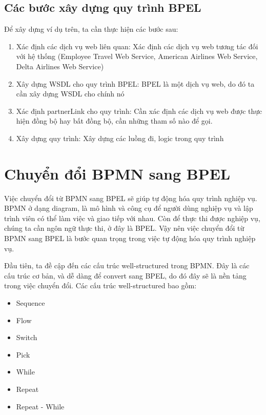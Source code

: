 \subsection{Các bước xây dựng quy trình BPEL}
Để xây dựng ví dụ trên, ta cần thực hiện các bước sau:
\begin{enumerate}
	\item Xác định các dịch vụ web liên quan: Xác định các dịch vụ web tương tác đối với hệ thống (Employee Travel Web Service, American Airlines Web Service, Delta Airlines Web Service)
	\item Xây dựng WSDL cho quy trình BPEL: BPEL là một dịch vụ web, do đó ta cần xây dựng WSDL cho chính nó
	\item Xác định partnerLink cho quy trình: Cần xác định các dịch vụ web được thực hiện đồng bộ hay bất đồng bộ, cần những tham số nào để gọi.
	\item Xây dựng quy trình: Xây dựng các luồng đi, logic trong quy trình
\end{enumerate} 



\section{Chuyển đổi BPMN sang BPEL}
\hspace*{0.5cm} \par Việc chuyển đổi từ BPMN sang BPEL sẽ giúp tự động hóa quy trình nghiệp vụ. BPMN ở dạng diagram, là mô hình và công cụ để người dùng nghiệp vụ và lập trình viên có thể làm việc và giao tiếp với nhau. 
Còn để thực thi được nghiệp vụ, chúng ta cần ngôn ngữ thực thi, ở đây là BPEL. Vậy nên việc chuyển đổi từ BPMN sang BPEL là bước quan trọng trong việc tự động hóa quy trình nghiệp vụ.

\par Đầu tiên, ta đề cập đến các cấu trúc well-structured trong BPMN. Đây là các cấu trúc cơ bản, và dễ dàng để convert sang BPEL, do đó đây sẽ là nền tảng trong việc chuyển đổi. Các cấu trúc well-structured bao gồm:
\begin{itemize}
	\item Sequence
	\item Flow
	\item Switch
	\item Pick
	\item While
	\item Repeat
	\item Repeat - While
\end{itemize}

